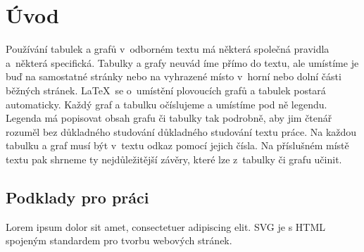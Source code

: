 \chapter{Úvod}

Používání tabulek a grafů v~odborném textu má některá společná pravidla a~některá specifická.
Tabulky a grafy neuvád íme přímo do textu, ale umístíme je buď na samostatné stránky nebo na vyhrazené místo v~horní nebo dolní části běžných stránek.
\LaTeX\ se o~umístění plovoucích grafů a tabulek postará automaticky.
Každý graf a tabulku očíslujeme a umístíme pod ně legendu.
Legenda má popisovat obsah grafu či tabulky tak podrobně, aby jim čtenář rozuměl bez důkladného studování důkladného studování textu práce.
Na každou tabulku a graf musí být v~textu odkaz pomocí jejich čísla.
Na příslušném místě textu pak shrneme ty nejdůležitější závěry, které lze z~tabulky či grafu učinit.


\section{Podklady pro práci}

Lorem ipsum dolor sit amet, consectetuer adipiscing elit. SVG \cite{mdn-svg} je s
HTML spojeným standardem pro tvorbu webových stránek.
